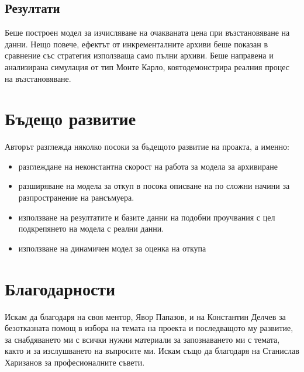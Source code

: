 \documentclass[11pt, a4paper]{article}
\theoremstyle{definition}
\begin{document}
		\subsection{Резултати}
			Беше построен модел за изчисляване на очакваната цена при възстановяване на данни. Нещо повече, ефектът от инкременталните архиви беше показан в сравнение със стратегия използваща само пълни архиви. Беше направена и анализирана симулация от тип Монте Карло, коятодемонстрира реалния процес на възстановяване.
	\section{Бъдещо развитие}
		Авторът разглежда няколко посоки за бъдещото развитие на проакта, а именно:
		\begin{itemize}
			\item разглеждане на неконстантна скорост на работа за модела за архивиране
			\item разширяване на модела за откуп в посока описване на по сложни начини за разпространение на рансъмуера.
			\item използване на резултатите и базите данни на подобни проучвания с цел подкрепянето на модела с реални данни.\cite{paquet2019ransomware}
			\item използване на динамичен модел за оценка на откупа
		\end{itemize}
	\section{Благодарности}
		Искам да благодаря на своя ментор, Явор Папазов, и на Константин Делчев за безотказната помощ в избора на темата на проекта и последващото му развитие, за снабдяването ми с всички нужни материали за запознаването ми с темата, както и за изслушването на въпросите ми. Искам също да благодаря на Станислав Харизанов за професионалните съвети.
\nocite{*}


\end{document}
